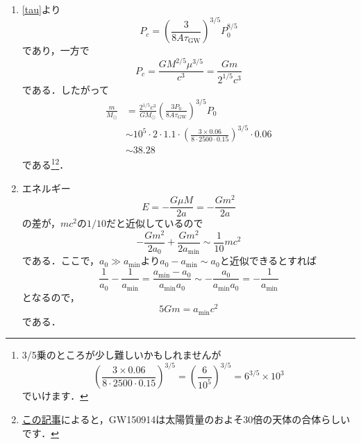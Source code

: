 \documentclass[a4paper,pdflatex,ja=standard]{bxjsarticle}
\begin{document}
\begin{enumerate}
  \item 
  \eqref{tau}より
  \begin{equation}
    P_{c}
    =
    \left( \frac{3}{8A\tau_{\text{GW}}} \right)^{3/5}P_{0}^{8/5}
  \end{equation}
  であり，一方で
  \begin{equation}
    P_{c}
    =
    \frac{GM^{2/5}\mu^{3/5}}{c^3}    
    =
    \frac{Gm}{2^{1/5} c^3}
  \end{equation}
  である．したがって
  \begin{align}
    \frac{m}{M_{\odot}}
    &=
    \frac{2^{1/5}c^3}{GM_{\odot}}\left( \frac{3P_{0}}{8A\tau_{\text{GW}}} \right)^{3/5}P_{0}
    \nonumber
    \\
    &\sim
    10^{5}
    \cdot
    2
    \cdot
    1.1
    \cdot
    \left( \frac{3\times0.06}{8\cdot2500\cdot0.15} \right)^{3/5}
    \cdot
    0.06
    \nonumber
    \\
    &\sim
    38.28
  \end{align}
  である\footnote{3/5乗のところが少し難しいかもしれませんが
    \begin{equation}
      \left( \frac{3\times0.06}{8\cdot2500\cdot0.15} \right)^{3/5}
      =
      \left( \frac{6}{10^5} \right)^{3/5}
      =
      6^{3/5}\times10^{3}
    \end{equation}
    でいけます．
  }\footnote{\href{https://www.ligo.org/science/Publication-GW150914/science-summary-japanese.pdf}{この記事}によると，GW150914は太陽質量のおよそ30倍の天体の合体らしいです．}．

  \item 
  エネルギー
  \begin{equation}
    E
    =
    -\frac{G\mu M}{2a}
    =
    -\frac{Gm^2}{2a}
  \end{equation}
  の差が，$mc^2$の$1/10$だと近似しているので
  \begin{equation}
    -\frac{Gm^2}{2a_{0}}
    +\frac{Gm^2}{2a_{\min}}
    \sim
    \frac{1}{10}mc^2
  \end{equation}
  である．ここで，$a_{0}\gg a_{\min}$より$a_{0}-a_{\min}\sim a_{0}$と近似できるとすれば
  \begin{equation}
    \frac{1}{a_{0}}-\frac{1}{a_{\min}}
    =
    \frac{a_{\min}-a_{0}}{a_{\min}a_{0}}
    \sim
    -\frac{a_{0}}{a_{\min}a_{0}}
    =
    -\frac{1}{a_{\min}}
  \end{equation}
  となるので，
  \begin{equation}
    5Gm
    =
    a_{\min}c^2
  \end{equation}
  である．
\end{enumerate}
\end{document}

